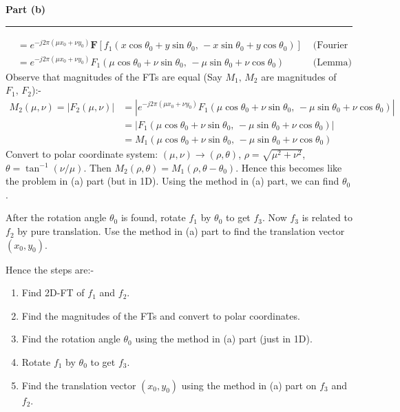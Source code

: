 \documentclass[a4paper,12pt]{article}
\newenvironment{solution}[2][]{%
\begin{mdframed}[linecolor=blue!70!black, linewidth=2pt, roundcorner=10pt, backgroundcolor=yellow!10!white, skipabove=12pt, skipbelow=12pt]%
	\textbf{\large #2}
	\par\noindent\rule{\textwidth}{0.4pt}
}{
\end{mdframed}
}
\begin{document}
\begin{solution}{Part (b)}
\begin{align*}
		&= e^{-j2\pi (\mu x_0 + \nu y_0)} \mathbf{F} [f_1(x \cos \theta_0 + y \sin \theta_0, \, - x \sin \theta_0 + y \cos \theta_0)] &\text{ (Fourier Shift Theorem)}\\
		&= e^{-j2\pi (\mu x_0 + \nu y_0)} F_1(\mu \cos \theta_0 + \nu \sin \theta_0, \, - \mu \sin \theta_0 + \nu \cos \theta_0) &\text{ (Lemma)}
	\end{align*}
	Observe that magnitudes of the FTs are equal (Say $M_1, \, M_2$ are magnitudes of $F_1, \, F_2$):-
	\begin{align*}
		M_2(\mu, \nu) = |F_2(\mu, \nu)| &= |e^{-j2\pi (\mu x_0 + \nu y_0)} F_1(\mu \cos \theta_0 + \nu \sin \theta_0, \, - \mu \sin \theta_0 + \nu \cos \theta_0)| \\
		&= |F_1(\mu \cos \theta_0 + \nu \sin \theta_0, \, - \mu \sin \theta_0 + \nu \cos \theta_0)| \\
		&= M_1(\mu \cos \theta_0 + \nu \sin \theta_0, \, - \mu \sin \theta_0 + \nu \cos \theta_0)
	\end{align*}
	Convert to polar coordinate system: $(\mu, \nu) \rightarrow (\rho, \theta)$, $\rho = \sqrt{\mu^2 + \nu^2}$, $\theta = \tan^{-1}(\nu/\mu)$. Then $M_2(\rho, \theta) = M_1(\rho, \theta - \theta_0)$. Hence this becomes like the problem in (a) part (but in 1D). Using the method in (a) part, we can find $\theta_0$.

	After the rotation angle $\theta_0$ is found, rotate $f_1$ by $\theta_0$ to get $f_3$. Now $f_3$ is related to $f_2$ by pure translation. Use the method in (a) part to find the translation vector $(x_0, y_0)$.

	Hence the steps are:-
	\begin{enumerate}
		\item Find 2D-FT of $f_1$ and $f_2$.
		\item Find the magnitudes of the FTs and convert to polar coordinates.
		\item Find the rotation angle $\theta_0$ using the method in (a) part (just in 1D).
		\item Rotate $f_1$ by $\theta_0$ to get $f_3$.
		\item Find the translation vector $(x_0, y_0)$ using the method in (a) part on $f_3$ and $f_2$.
	\end{enumerate}
\end{solution}
\end{document}
